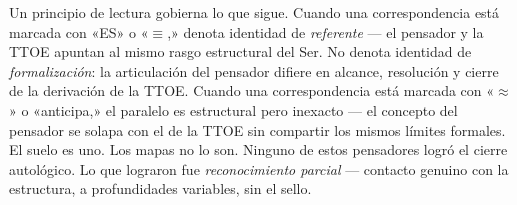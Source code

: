 \documentclass[10pt, openany, oneside]{book}
\begin{document}
Un principio de lectura gobierna lo que sigue. Cuando una correspondencia está marcada con «ES» o «$\equiv$,» denota identidad de \textit{referente} --- el pensador y la TTOE apuntan al mismo rasgo estructural del Ser. No denota identidad de \textit{formalización}: la articulación del pensador difiere en alcance, resolución y cierre de la derivación de la TTOE. Cuando una correspondencia está marcada con «$\approx$» o «anticipa,» el paralelo es estructural pero inexacto --- el concepto del pensador se solapa con el de la TTOE sin compartir los mismos límites formales. El suelo es uno. Los mapas no lo son. Ninguno de estos pensadores logró el cierre autológico. Lo que lograron fue \textit{reconocimiento parcial} --- contacto genuino con la estructura, a profundidades variables, sin el sello.

\end{document}
